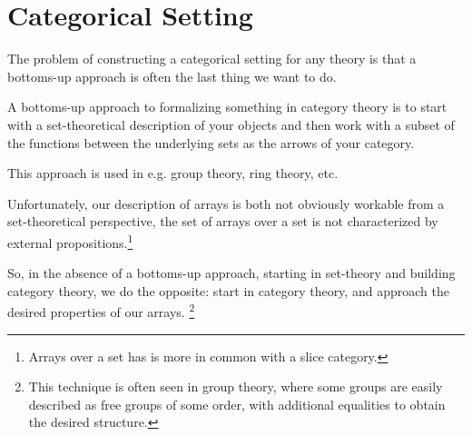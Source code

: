 \documentclass{DIKU-report-variant}
\begin{document}
\section{Categorical Setting}

The problem of constructing a categorical setting for any theory
is that a bottoms-up approach is often the last thing we want to do.

A bottoms-up approach to formalizing something in category theory is to
start with a set-theoretical description of your objects
and then work with a subset of the functions between the underlying sets as
the arrows of your category.

This approach is used in e.g. group theory, ring theory, etc.

Unfortunately, our description of arrays is both not obviously workable from a
set-theoretical perspective, the set of arrays over a set is not characterized by
external propositions.\footnote{Arrays over a set has is more in common with a slice category.}

So, in the absence of a bottoms-up approach, starting in set-theory and building category theory,
we do the opposite: start in category theory, and approach the desired properties of our arrays.
\footnote{This technique is often seen in group theory, where some groups are easily described as
free groups of some order, with additional equalities to obtain the desired structure.}
\end{document}
